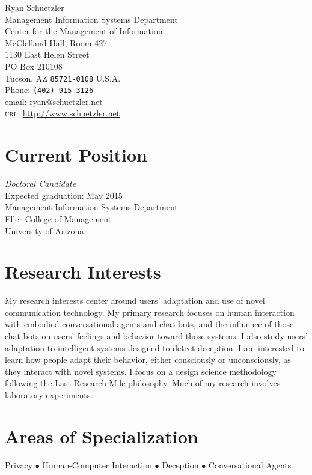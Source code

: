 \documentclass[10pt, a4paper]{article}
\begin{document}
{\LARGE Ryan Schuetzler}\\[1cm]
 Management Information Systems Department\\
 Center for the Management of Information\\
 McClelland Hall, Room 427\\
 1130 East Helen Street\\
 PO Box 210108\\
 Tucson, AZ \texttt{85721-0108}
U.S.A.\\[.2cm]
Phone: \texttt{(402) 915-3126}\\[.2cm]
email: \href{mailto:ryan@schuetzler.net}{ryan@schuetzler.net}\\
\textsc{url}: \href{http://www.schuetzler.net}{http://www.schuetzler.net}\\ 

\section*{Current Position}
\emph{Doctoral Candidate}\\
Expected graduation: May 2015\\
Management Information Systems Department\\
Eller College of Management\\
University of Arizona


\section*{Research Interests}

My research interests center around users' adaptation and use of novel
communication technology. My primary research focuses on human interaction with
embodied conversational agents and chat bots, and the influence of those chat
bots on users' feelings and behavior toward those systems. I also study users'
adaptation to intelligent systems designed to detect deception. I am interested
to learn how people adapt their behavior, either consciously or unconsciously,
as they interact with novel systems. I focus on a design science methodology
following the Last Research Mile philosophy. Much of my research involves
laboratory experiments.

\section*{Areas of Specialization}
Privacy $\bullet$ Human-Computer Interaction $\bullet$ Deception $\bullet$
Conversational Agents
\end{document}
